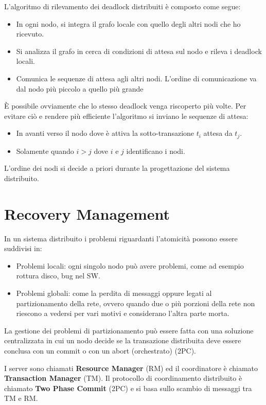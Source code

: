L'algoritmo di rilevamento dei deadlock distribuiti è composto come segue:
\begin{itemize}
    \item In ogni nodo, si integra il grafo locale con quello degli altri nodi
          che ho ricevuto.
    \item Si analizza il grafo in cerca di condizioni di attesa sul nodo e
          rileva i deadlock locali.
    \item Comunica le sequenze di attesa agli altri nodi. L'ordine di
          comunicazione va dal nodo più piccolo a quello più grande
\end{itemize}

È possibile ovviamente che lo stesso deadlock venga riscoperto più volte. Per
evitare ciò e rendere più efficiente l'algoritmo si inviano le sequenze di attesa:
\begin{itemize}
    \item In avanti verso il nodo dove è attiva la sotto-transazione $t_i$
          attesa da $t_j$.
    \item Solamente quando $i > j$ dove $i$ e $j$ identificano i nodi.
\end{itemize}
L'ordine dei nodi si decide a priori durante la progettazione del sistema distribuito.
\section{Recovery Management}
In un sistema distribuito i problemi riguardanti l'atomicità possono essere
suddivisi in:
\begin{itemize}
    \item Problemi locali: ogni singolo nodo può avere problemi, come ad
          esempio rottura disco, bug nel SW.
    \item Problemi globali: come la perdita di messaggi oppure legati al
          partizionamento della rete, ovvero quando due o più porzioni della
          rete non riescono a vedersi per vari motivi e considerano l'altra
          parte morta.
\end{itemize}
La gestione dei problemi di partizionamento può essere fatta con una soluzione
centralizzata in cui un nodo decide se la transazione distribuita deve essere
conclusa con un commit o con un abort (orchestrato) (2PC).

I server sono chiamati \textbf{Resource Manager} (RM) ed il coordinatore è
chiamato \textbf{Transaction Manager} (TM). Il protocollo di coordinamento
distribuito è chiamato \textbf{Two Phase Commit} (2PC) e si basa sullo scambio
di messaggi tra TM e RM.

